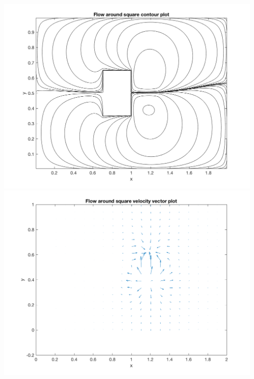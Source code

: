 \documentclass[11pt, oneside]{article}
\begin{document}
\begin{enumerate}
    \begin{center}
      \includegraphics[scale=0.5]{Figures/06_03.png}
      \includegraphics[scale=0.5]{Figures/06_04.png}
    \end{center}


\end{enumerate}
\end{document}

